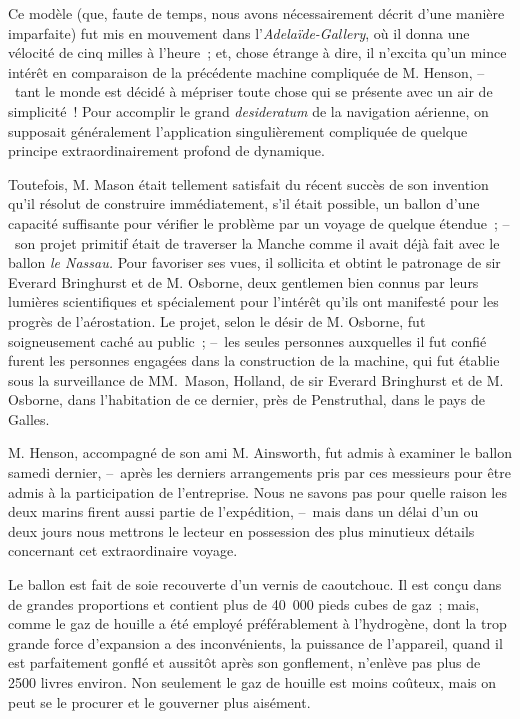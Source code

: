 \documentclass[french,twoside]{book} %
\begin{document}
Ce modèle (que, faute de temps, nous avons nécessairement décrit d’une manière imparfaite) fut mis en mouvement dans l’\emph{Adelaïde-Gallery}, où il donna une vélocité de cinq milles à l’heure ; et, chose étrange à dire, il n’excita qu’un mince intérêt en comparaison de la précédente machine compliquée de M. Henson, – tant le monde est décidé à mépriser toute chose qui se présente avec un air de simplicité ! Pour accomplir le grand \emph{desideratum} de la navigation aérienne, on supposait généralement l’application singulièrement compliquée de quelque principe extraordinairement profond de dynamique.\par
Toutefois, M. Mason était tellement satisfait du récent succès de son invention qu’il résolut de construire immédiatement, s’il était possible, un ballon d’une capacité suffisante pour vérifier le problème par un voyage de quelque étendue ; – son projet primitif était de traverser la Manche comme il avait déjà fait avec le ballon \emph{le Nassau.} Pour favoriser ses vues, il sollicita et obtint le patronage de sir Everard Bringhurst et de M. Osborne, deux gentlemen bien connus par leurs lumières scientifiques et spécialement pour l’intérêt qu’ils ont manifesté pour les progrès de l’aérostation. Le projet, selon le désir de M. Osborne, fut soigneusement caché au public ; – les seules personnes auxquelles il fut confié furent les personnes engagées dans la construction de la machine, qui fut établie sous la surveillance de MM. Mason, Holland, de sir Everard Bringhurst et de M. Osborne, dans l’habitation de ce dernier, près de Penstruthal, dans le pays de Galles.\par
M. Henson, accompagné de son ami M. Ainsworth, fut admis à examiner le ballon samedi dernier, – après les derniers arrangements pris par ces messieurs pour être admis à la participation de l’entreprise. Nous ne savons pas pour quelle raison les deux marins firent aussi partie de l’expédition, – mais dans un délai d’un ou deux jours nous mettrons le lecteur en possession des plus minutieux détails concernant cet extraordinaire voyage.\par
Le ballon est fait de soie recouverte d’un vernis de caoutchouc. Il est conçu dans de grandes proportions et contient plus de 40 000 pieds cubes de gaz ; mais, comme le gaz de houille a été employé préférablement à l’hydrogène, dont la trop grande force d’expansion a des inconvénients, la puissance de l’appareil, quand il est parfaitement gonflé et aussitôt après son gonflement, n’enlève pas plus de 2500 livres environ. Non seulement le gaz de houille est moins coûteux, mais on peut se le procurer et le gouverner plus aisément.\par
\end{document}
